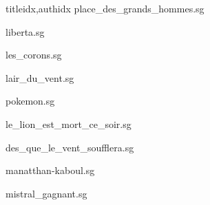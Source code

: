 \documentclass[12pt]{article}
\begin{document}
\begin{songs}{titleidx,authidx}
{place_des_grands_hommes.sg}


{liberta.sg}


{les_corons.sg}


{lair_du_vent.sg}


{pokemon.sg}


{le_lion_est_mort_ce_soir.sg}


{des_que_le_vent_soufflera.sg}


{manatthan-kaboul.sg}


{mistral_gagnant.sg}



\end{songs}
\end{document}
